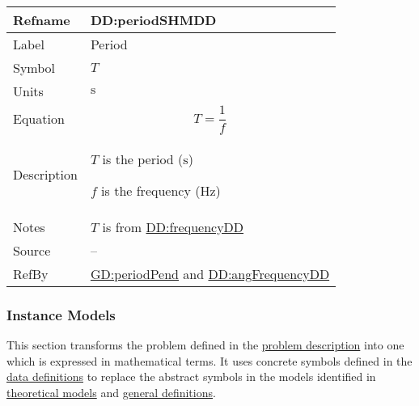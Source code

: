 \documentclass[12pt]{article}
\begin{document}
\vspace{\baselineskip}
\noindent
\begin{minipage}{\textwidth}
\begin{tabular}{>{\raggedright}p{}>{\raggedright\arraybackslash}p{}}
\toprule \textbf{Refname} & \textbf{DD:periodSHMDD}
\label{DD:periodSHMDD}
\\ \midrule
Label & Period
        
\\ \midrule
Symbol & $T$
         
\\ \midrule
Units & ${\text{s}}$
        
\\ \midrule
Equation & \begin{displaymath}
           T=\frac{1}{f}
           \end{displaymath}
\\ \midrule
Description & \begin{symbDescription}
              \item{$T$ is the period (${\text{s}}$)}
              \item{$f$ is the frequency (${\text{Hz}}$)}
              \end{symbDescription}
\\ \midrule
Notes & $T$ is from \hyperref[DD:frequencyDD]{DD:frequencyDD}
        
\\ \midrule
Source & --
         
\\ \midrule
RefBy & \hyperref[GD:periodPend]{GD:periodPend} and \hyperref[DD:angFrequencyDD]{DD:angFrequencyDD}
        
\\ \bottomrule
\end{tabular}
\end{minipage}

\subsubsection{Instance Models}
\label{Sec:IMs}
This section transforms the problem defined in the \hyperref[Sec:ProbDesc]{problem description} into one which is expressed in mathematical terms. It uses concrete symbols defined in the \hyperref[Sec:DDs]{data definitions} to replace the abstract symbols in the models identified in \hyperref[Sec:TMs]{theoretical models} and \hyperref[Sec:GDs]{general definitions}.
\end{document}
